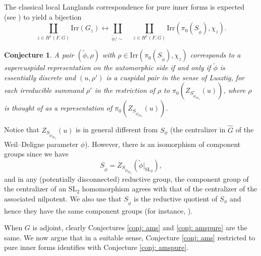 \documentclass{amsart}
\newtheorem{conjecture}[theorem]{Conjecture}
\theoremstyle{definition}
\theoremstyle{remark}
\numberwithin{equation}{section}
\newcommand{\SL}{\mathrm{SL}}
\newcommand{\Irr}{\mathrm{Irr}}
\newcommand{\wh}{\widehat}
\begin{document}
The classical local Langlands correspondence for pure inner forms is expected (see \cite{KalethaLLCnonQS}) to yield a bijection
\begin{equation*}
    \coprod\limits_{z \in H^1(F,G)} \Irr(G_z) \longleftrightarrow \coprod\limits_{\tilde{\phi} / \sim } \quad \coprod\limits_{z \in H^1(F,G)} \Irr(\pi_0(S_{\tilde{\phi}}), \chi_z).
\end{equation*}
\begin{conjecture}{\label{conj: amspure}}
    A pair $(\tilde{\phi}, \rho)$ with $\rho \in \Irr(\pi_0(S_{\tilde{\phi}}), \chi_z)$ corresponds to a supercuspidal representation on the automorphic side if and only if $\tilde{\phi}$ is essentially discrete and $(u, \rho')$ is a cuspidal pair in the sense of Lusztig, for each irreducible summand $\rho'$ in the restriction of $\rho$ to $\pi_0(Z_{S^{\circ}_{\tilde{\phi}|_{W_F}}}(u))$, where $\rho$ is thought of as a representation of $\pi_0(Z_{S_{\tilde{\phi}|_{W_F}}}(u))$. 
\end{conjecture}
Notice that $Z_{S_{\tilde{\phi}|_{W_F}}}(u)$ is in general different from $S_{\phi}$ (the centralizer in $\wh{G}$ of the Weil--Deligne parameter $\phi$). However, there is an isomorphism of component groups since we have 
\begin{equation*}
    S_{\tilde{\phi}} = Z_{S_{\tilde{\phi}|_{W_F}}}(\tilde{\phi}|_{\SL_2}),
\end{equation*}
and in any (potentially disconnected) reductive group, the component group of the centralizer of an $\SL_2$ homomorphism agrees with that of the centralizer of the associated nilpotent. We also use that $S_{\tilde{\phi}}$ is the reductive quotient of $S_{\phi}$ and hence they have the same component groups (for instance, \cite[Proposition 3.7]{BMImaiYoucis}). 

When $G$ is adjoint, clearly Conjectures \ref{conj: ams} and \ref{conj: amspure} are the same. We now argue that in a suitable sense, Conjecture \ref{conj: ams} restricted to pure inner forms identifies with Conjecture \ref{conj: amspure}.
\end{document}
